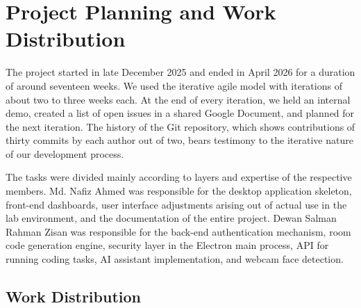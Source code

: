 \documentclass[12pt, a4paper]{report}
\begin{document}
\section{Project Planning and Work Distribution}

\begin{justify}
  {\fontsize{12}{18}\selectfont
    The project started in late December 2025 and ended in April 2026 for a duration of around seventeen weeks. We used the iterative agile model with iterations of about two to three weeks each. At the end of every iteration, we held an internal demo, created a list of open issues in a shared Google Document, and planned for the next iteration. The history of the Git repository, which shows contributions of thirty commits by each author out of two, bears testimony to the iterative nature of our development process.

    The tasks were divided mainly according to layers and expertise of the respective members. Md. Nafiz Ahmed was responsible for the desktop application skeleton, front-end dashboards, user interface adjustments arising out of actual use in the lab environment, and the documentation of the entire project. Dewan Salman Rahman Zisan was responsible for the back-end authentication mechanism, room code generation engine, security layer in the Electron main process, API for running coding tasks, AI assistant implementation, and webcam face detection.
  }
\end{justify}

\subsection{Work Distribution}
\end{document}
